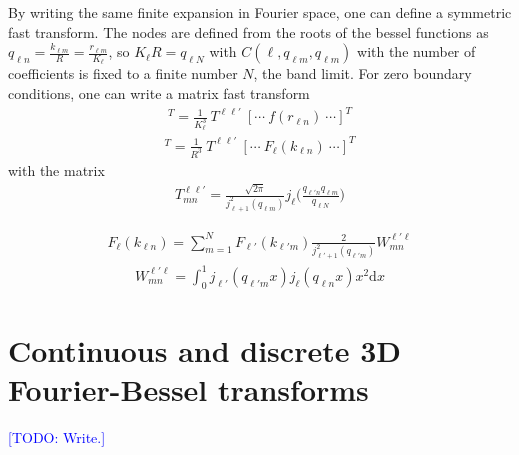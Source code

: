 \documentclass{aastex6}
\renewcommand{\d}{{\mathrm{d}}}
\newcommand{\eqn}[1]{\begin{eqnarray}#1\end{eqnarray}}
\newcommand{\todo}[1]{\textcolor{blue}{[TODO: #1]}}
\begin{document}
By writing the same finite expansion in Fourier space, one can define a symmetric fast transform. 
The nodes are defined from the roots of the bessel functions as $q_{\ell n}  = \frac{k_{\ell m}}{R} = \frac{r_{\ell m}}{K_\ell}$, so $K_\ell R = q_{\ell N}$ with
$C(\ell, q_{\ell m}, q_{\ell m})$ with the number of coefficients is fixed to a finite number $N$, the band limit. 
For zero boundary conditions, one can write a matrix fast transform
\eqn{
	[ \cdots \ F_\ell(k_{\ell' m}) \ \cdots]^T = \frac{1}{K_\ell^3} \ T^{\ell \ell'} \  [ \cdots \ f(r_{\ell n}) \ \cdots]^T
}
\eqn{
	[ \cdots \ f(r_{\ell' m}) \ \cdots]^T = \frac{1}{R^3} \ T^{\ell \ell'} \  [ \cdots \ F_\ell(k_{\ell n}) \ \cdots]^T
}
with the matrix
\eqn{
	 T^{\ell \ell'}_{mn} = \frac{\sqrt{2\pi}}{j^2_{\ell+1}(q_{\ell m})} j_\ell \bigl(\frac{q_{\ell' n}q_{\ell m}}{q_{\ell N}} \bigr)
}

\eqn{
	F_\ell(k_{\ell n}) = \sum_{m=1}^N F_{\ell'}(k_{\ell' m}) \frac{2}{j^2_{\ell'+1}(q_{\ell'm})} W^{\ell ' \ell}_{mn}
}
\eqn{
	W^{\ell ' \ell}_{mn} = \int_0^1 j_{\ell '}(q_{\ell ' m}x) j_\ell(q_{\ell n}x) x^2 \d x
}


\section{Continuous and discrete 3D Fourier-Bessel transforms}

\todo{Write.}





\end{document}
